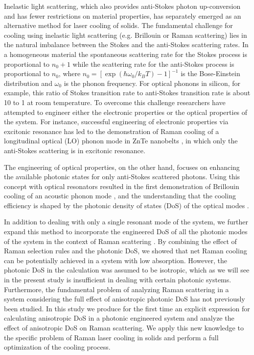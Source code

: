 \documentclass[%
 reprint,
superscriptaddress,
 amsmath,amssymb,
 aps,
pra,
]{revtex4-1}
\begin{document}
Inelastic light scattering, which also provides anti-Stokes photon up-conversion and has fewer restrictions on material properties, has separately emerged as an alternative method for laser cooling of solids. The fundamental challenge for cooling using inelastic light scattering (e.g. Brillouin or Raman scattering) lies in the natural imbalance between the Stokes and the anti-Stokes scattering rates. In a homogeneous material the spontaneous scattering rate for the Stokes process is proportional to $n_0+1$ while the scattering rate for the anti-Stokes process is proportional to $n_0$, where $n_0=[\exp(\hbar \omega_0/k_BT)-1]^{-1}$ is the Bose-Einstein distribution and $\omega_0$ is the phonon frequency. For optical phonons in silicon, for example, this ratio of Stokes transition rate to anti-Stokes transition rate is about 10 to 1 at room temperature.
To overcome this challenge researchers have attempted to engineer either the electronic properties \cite{khurgin2006band,ding2012anti,zhang2013laser,zhang2016resolved} or the optical properties \cite{bahl2012observation,chen2015raman,chen2016brillouin, kim2017role} of the system. For instance, successful engineering of electronic properties via excitonic resonance has led to the demonstration of Raman cooling of a longitudinal optical (LO) phonon mode in ZnTe nanobelts \cite{zhang2016resolved}, in which only the anti-Stokes scattering is in excitonic resonance.

The engineering of optical properties, on the other hand, focuses on enhancing the available photonic states \cite{purcell1946spontaneous, gaponenko2002effects} for only anti-Stokes scattered photons.
%
Using this concept with optical resonators resulted in the first demonstration of Brillouin cooling of an acoustic phonon mode \cite{bahl2012observation}, and the understanding that the cooling efficiency is shaped by the photonic density of states (DoS) of the optical modes \cite{kim2017role}.


In addition to dealing with only a single resonant mode of the system, we further expand this method to incorporate the engineered DoS of all the photonic modes of the system in the context of Raman scattering \cite{chen2015raman}. By combining the effect of Raman selection rules and the photonic DoS, we showed that net Raman cooling can be potentially achieved in a system with low absorption.
However, the photonic DoS in the calculation was assumed to be isotropic, which as we will see in the present study is insufficient in dealing with certain photonic systems. Furthermore, the fundamental problem of analyzing Raman scattering in a system considering the full effect of anisotropic photonic DoS has not previously been studied. In this study we produce for the first time an explicit expression for calculating anisotropic DoS in a photonic engineered system and analyze the effect of anisotropic DoS on Raman scattering. We apply this new knowledge to the specific problem of Raman laser cooling in solids and perform a full optimization of the cooling process.
\end{document}
